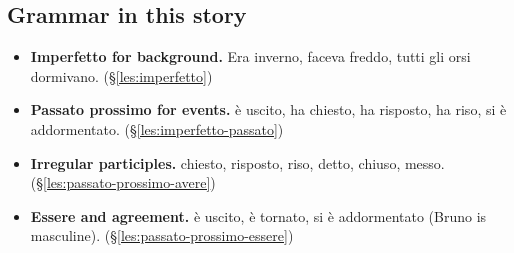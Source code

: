 \documentclass[11pt,a4paper,twoside,openright]{book}
\begin{document}
\subsection*{Grammar in this story}
\begin{itemize}
\item\relax \textbf{Imperfetto for background.} Era inverno, faceva freddo, tutti gli orsi dormivano. (\S\ref{les:imperfetto})
\item\relax \textbf{Passato prossimo for events.} è uscito, ha chiesto, ha risposto, ha riso, si è addormentato. (\S\ref{les:imperfetto-passato})
\item\relax \textbf{Irregular participles.} chiesto, risposto, riso, detto, chiuso, messo. (\S\ref{les:passato-prossimo-avere})
\item\relax \textbf{Essere and agreement.} è uscito, è tornato, si è addormentato (Bruno is masculine). (\S\ref{les:passato-prossimo-essere})
\end{itemize}
\end{document}
